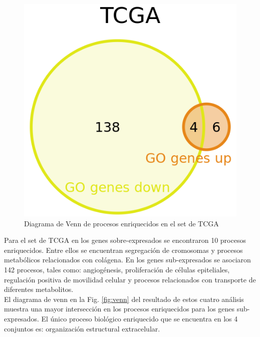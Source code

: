 \documentclass{article}
\begin{document}
\begin{figure}
\centering
\includegraphics[scale=1.0]{../figures/TCGA_webgestalt.png}
\caption{Diagrama de Venn de procesos enriquecidos en el set de TCGA}
\label{fig:vennTCGA}
\end{figure}
Para el set de TCGA en los genes sobre-expresados se encontraron 10 procesos enriquecidos. Entre ellos se encuentran segregación de cromosomas y procesos metabólicos relacionados con colágena. En los genes sub-expresados se asociaron 142 procesos, tales como: angiogénesis, proliferación de células epiteliales, regulación positiva de movilidad celular y procesos relacionados con transporte de diferentes metabolitos. \\
El diagrama de venn en la Fig. \ref{fig:venn} del resultado de estos cuatro análisis muestra una mayor intersección en los procesos enriquecidos para los genes sub-expresados. El único proceso biológico enriquecido que se encuentra en los 4 conjuntos es: organización estructural extracelular.\\
\end{document}
